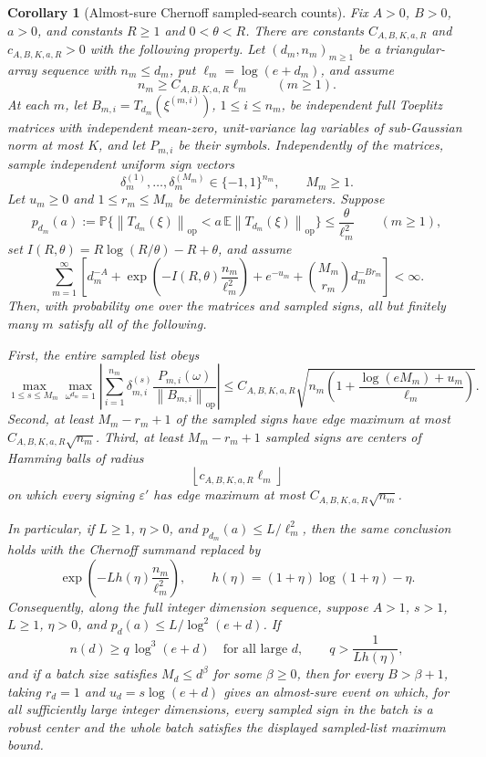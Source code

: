\documentclass[11pt]{amsart}
\numberwithin{equation}{section}
\newtheorem{corollary}[theorem]{Corollary}
\theoremstyle{definition}
\theoremstyle{remark}
\newcommand{\op}{\mathrm{op}}
\newcommand{\Prob}{\mathbb P}
\newcommand{\Exp}{\mathbb E}
\newcommand{\norm}[1]{\left\lVert #1\right\rVert}
\newcommand{\eps}{\varepsilon}
\begin{document}
\begin{corollary}[Almost-sure Chernoff sampled-search counts]
\label{cor:normalizer-tail-chernoff-borel-counts}
Fix \(A>0\), \(B>0\), \(a>0\), and constants \(R\ge1\) and \(0<\theta<R\).
There are constants \(C_{A,B,K,a,R}\) and \(c_{A,B,K,a,R}>0\) with the following
property.  Let \((d_m,n_m)_{m\ge1}\) be a triangular-array sequence with
\(n_m\le d_m\), put \(\ell_m=\log(e+d_m)\), and assume
\[
  n_m\ge C_{A,B,K,a,R}\ell_m \qquad(m\ge1).
\]
At each \(m\), let \(B_{m,i}=T_{d_m}(\xi^{(m,i)})\), \(1\le i\le n_m\), be
independent full Toeplitz matrices with independent mean-zero, unit-variance
lag variables of sub-Gaussian norm at most \(K\), and let \(P_{m,i}\) be their
symbols.  Independently of the matrices, sample independent uniform sign
vectors
\[
  \delta_m^{(1)},\ldots,\delta_m^{(M_m)}\in\{-1,1\}^{n_m},
  \qquad M_m\ge1 .
\]
Let \(u_m\ge0\) and \(1\le r_m\le M_m\) be deterministic parameters.  Suppose
\[
  p_{d_m}(a):=
  \Prob\{\norm{T_{d_m}(\xi)}_{\op}
      <a\,\Exp\norm{T_{d_m}(\xi)}_{\op}\}
  \le \frac{\theta}{\ell_m^2}
  \qquad(m\ge1),
\]
set \(I(R,\theta)=R\log(R/\theta)-R+\theta\), and assume
\[
  \sum_{m=1}^\infty
  \left[
  d_m^{-A}
  +\exp\left(-I(R,\theta)\frac{n_m}{\ell_m^2}\right)
  +e^{-u_m}
  +\binom{M_m}{r_m}d_m^{-B r_m}
  \right]<\infty .
\]
Then, with probability one over the matrices and sampled signs, all but
finitely many \(m\) satisfy all of the following.

First, the entire sampled list obeys
\[
  \max_{1\le s\le M_m}\max_{\omega^{d_m}=1}
  \left|\sum_{i=1}^{n_m}\delta_{m,i}^{(s)}
  \frac{P_{m,i}(\omega)}{\norm{B_{m,i}}_{\op}}\right|
  \le
  C_{A,B,K,a,R}\sqrt{
    n_m\left(1+\frac{\log(eM_m)+u_m}{\ell_m}\right)} .
\]
Second, at least \(M_m-r_m+1\) of the sampled signs have edge maximum at most
\(C_{A,B,K,a,R}\sqrt{n_m}\).  Third, at least \(M_m-r_m+1\) sampled signs are
centers of Hamming balls of radius
\[
  \left\lfloor c_{A,B,K,a,R}\ell_m\right\rfloor
\]
on which every signing \(\eps'\) has edge maximum at most
\(C_{A,B,K,a,R}\sqrt{n_m}\).

In particular, if \(L\ge1\), \(\eta>0\), and
\(p_{d_m}(a)\le L/\ell_m^2\), then the same conclusion holds with the Chernoff
summand replaced by
\[
  \exp\left(-Lh(\eta)\frac{n_m}{\ell_m^2}\right),
  \qquad h(\eta)=(1+\eta)\log(1+\eta)-\eta .
\]
Consequently, along the full integer dimension sequence, suppose \(A>1\),
\(s>1\), \(L\ge1\), \(\eta>0\), and \(p_d(a)\le L/\log^2(e+d)\).  If
\[
  n(d)\ge q\,\log^3(e+d)
  \quad\text{for all large }d,\qquad
  q>\frac1{Lh(\eta)},
\]
and if a batch size satisfies \(M_d\le d^\beta\) for some \(\beta\ge0\), then
for every \(B>\beta+1\), taking \(r_d=1\) and
\(u_d=s\log(e+d)\) gives an almost-sure event on which, for all sufficiently
large integer dimensions, every sampled sign in the batch is a robust center and
the whole batch satisfies the displayed sampled-list maximum bound.
\end{corollary}
\end{document}
